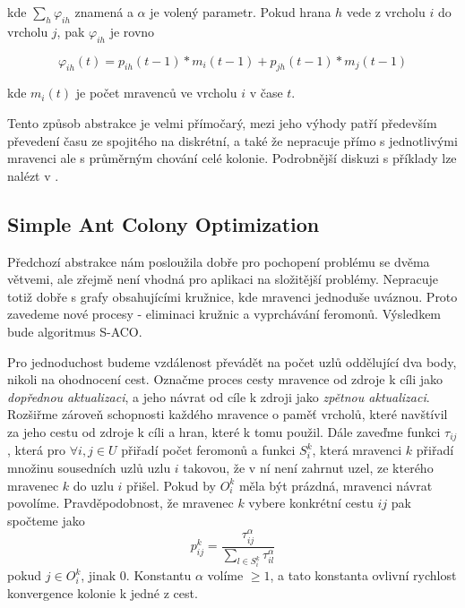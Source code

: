 \documentclass[12pt]{article}
\begin{document}
kde $\sum_{h}\varphi_{ih}$ znamená  a $\alpha$ je volený parametr. Pokud hrana $h$ vede z vrcholu $i$ do vrcholu $j$, pak $\varphi_{ih}$ je rovno

\begin{equation}\label{abstraktphi}
\varphi_{ih}(t) = p_{ih}(t-1)*m_i(t-1) + p_{jh}(t-1)*m_j(t-1)
 \end{equation}
 
kde $m_i(t)$ je počet mravenců ve vrcholu $i$ v čase $t$. 

Tento způsob abstrakce je velmi přímočarý, mezi jeho výhody patří především převedení času ze spojitého na diskrétní, a také že nepracuje přímo s jednotlivými mravenci ale s průměrným chování celé kolonie. Podrobnější diskuzi s příklady lze nalézt v \cite{maniezzo2004}.

\subsection{Simple Ant Colony Optimization}
Předchozí abstrakce nám posloužila dobře pro pochopení problému se dvěma větvemi, ale zřejmě není vhodná pro aplikaci na složitější problémy. Nepracuje totiž dobře s grafy obsahujícími kružnice, kde mravenci jednoduše uváznou. Proto zavedeme nové procesy - eliminaci kružnic a vyprchávání feromonů. Výsledkem bude algoritmus \ac{S-ACO}.

Pro jednoduchost budeme vzdálenost převádět na počet uzlů oddělující dva body, nikoli na ohodnocení cest. Označme proces cesty mravence od zdroje k cíli jako \emph{dopřednou aktualizaci}, a jeho návrat od cíle k zdroji jako \emph{zpětnou aktualizaci}. Rozšiřme zárove\v{n} schopnosti každého mravence o pamě\v{t} vrcholů, které navštívil za jeho cestu od zdroje k cíli a hran, které k tomu použil. Dále zaveďme funkci $\tau_{ij}$, která pro $\forall i, j \in U$ přiřadí počet feromonů a funkci $S_{i}^{k}$, která mravenci $k$ přiřadí množinu sousedních uzlů uzlu $i$ takovou, že v ní není zahrnut uzel, ze kterého mravenec $k$ do uzlu $i$ přišel. Pokud by $O^k_i$ měla být prázdná, mravenci návrat povolíme. Pravděpodobnost, že mravenec $k$ vybere konkrétní cestu $ij$ pak spočteme jako 
\begin{equation}\label{sacopravdepodobnost}
p_{ij}^k = \frac{\tau_{ij}^\alpha}{\sum_{l \in S_{i}^k} \tau_{il}^\alpha}
\end{equation}
pokud $j \in O_{i}^{k}$, jinak $0$. Konstantu $\alpha$ volíme $\geq 1$, a tato konstanta ovlivní rychlost konvergence kolonie k jedné z cest.
\end{document}
